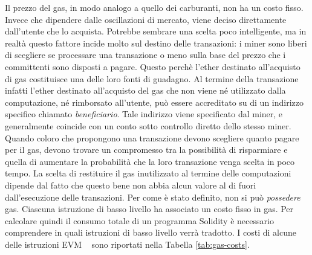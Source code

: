 \indent Il prezzo del gas, in modo analogo a quello dei carburanti, non ha un costo fisso. Invece che dipendere dalle oscillazioni di mercato, viene deciso direttamente dall'utente che lo acquista.
Potrebbe sembrare una scelta poco intelligente, ma in realtà questo fattore incide molto sul destino delle transazioni: i miner sono liberi di scegliere se processare una transazione o meno sulla base del prezzo che i committenti sono disposti a pagare. Questo perchè l'ether destinato all'acquisto di gas costituisce una delle loro fonti di guadagno. Al termine della transazione infatti l'ether destinato all'acquisto del gas che non viene né utilizzato dalla computazione, né rimborsato all'utente, può essere accreditato su di un indirizzo specifico chiamato \textit{beneficiario}. Tale indirizzo viene specificato dal miner, e generalmente coincide con un conto sotto controllo diretto dello stesso miner. Quando coloro che propongono una transazione devono scegliere quanto pagare per il gas, devono trovare un compromesso tra la possibilità di risparmiare e quella di aumentare la probabilità che la loro transazione venga scelta in poco tempo.\newline
\indent La scelta di restituire il gas inutilizzato al termine delle computazioni dipende dal fatto che questo bene non abbia alcun valore al di fuori dall'esecuzione delle transazioni. Per come è stato definito, non si può \textit{possedere} gas.\newline
\indent Ciascuna istruzione di basso livello ha associato un costo fisso in gas. Per calcolare quindi il consumo totale di un programma Solidity è necessario comprendere in quali istruzioni di basso livello verrà tradotto. I costi di alcune delle istruzioni EVM ~\cite{wood2014ethereum} sono riportati nella Tabella \ref{tab:gas-costs}.

